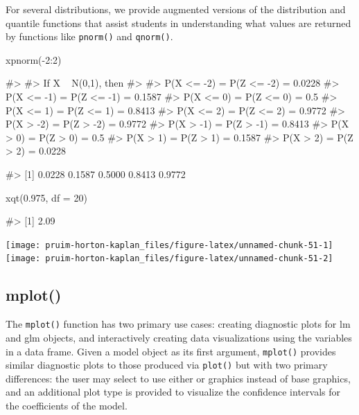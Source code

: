 For several distributions, we provide augmented versions of the
distribution and quantile functions that assist students in
understanding what values are returned by functions like
\texttt{pnorm()} and \texttt{qnorm()}.

\begin{Schunk}
\begin{Sinput}
xpnorm(-2:2)
\end{Sinput}
\begin{Soutput}
#> 
#> If X ~ N(0,1), then 
#> 
#>  P(X <= -2) = P(Z <= -2) = 0.0228
#>      P(X <= -1) = P(Z <= -1) = 0.1587
#>      P(X <= 0) = P(Z <= 0) = 0.5
#>      P(X <= 1) = P(Z <= 1) = 0.8413
#>      P(X <= 2) = P(Z <= 2) = 0.9772
#>  P(X >  -2) = P(Z >  -2) = 0.9772
#>      P(X >  -1) = P(Z >  -1) = 0.8413
#>      P(X >  0) = P(Z >  0) = 0.5
#>      P(X >  1) = P(Z >  1) = 0.1587
#>      P(X >  2) = P(Z >  2) = 0.0228
\end{Soutput}
\begin{Soutput}
#> [1] 0.0228 0.1587 0.5000 0.8413 0.9772
\end{Soutput}
\begin{Sinput}
xqt(0.975, df = 20)
\end{Sinput}
\begin{Soutput}
#> [1] 2.09
\end{Soutput}


\begin{center}\texttt{[image: pruim-horton-kaplan\_files/figure-latex/unnamed-chunk-51-1]} \texttt{[image: pruim-horton-kaplan\_files/figure-latex/unnamed-chunk-51-2]} \end{center}

\end{Schunk}

\subsection{mplot()}\label{mplot}

The \texttt{mplot()} function has two primary use cases: creating
diagnostic plots for lm and glm objects, and interactively creating data
visualizations using the variables in a data frame. Given a model object
as its first argument, \texttt{mplot()} provides similar diagnostic
plots to those produced via \texttt{plot()} but with two primary
differences: the user may select to use either  or
 \citep{ggplot2} graphics instead of base graphics, and
an additional plot type is provided to visualize the confidence
intervals for the coefficients of the model.

